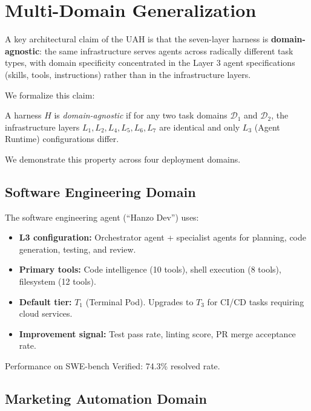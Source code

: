 \section{Multi-Domain Generalization}

\label{sec:domains}

A key architectural claim of the UAH is that the seven-layer harness is
\textbf{domain-agnostic}: the same infrastructure serves agents across
radically different task types, with domain specificity concentrated in the
Layer 3 agent specifications (skills, tools, instructions) rather than in
the infrastructure layers.

We formalize this claim:

\begin{definition}
A harness $H$ is \emph{domain-agnostic} if for any two task domains
$\mathcal{D}_1$ and $\mathcal{D}_2$, the infrastructure layers $L_1, L_2,
L_4, L_5, L_6, L_7$ are identical and only $L_3$ (Agent Runtime)
configurations differ.
\end{definition}

We demonstrate this property across four deployment domains.

\subsection{Software Engineering Domain}

The software engineering agent (``Hanzo Dev'') uses:
\begin{itemize}[leftmargin=1.5em]
    \item \textbf{L3 configuration:} Orchestrator agent + specialist agents
          for planning, code generation, testing, and review.
    \item \textbf{Primary tools:} Code intelligence (10 tools), shell
          execution (8 tools), filesystem (12 tools).
    \item \textbf{Default tier:} $T_1$ (Terminal Pod). Upgrades to $T_3$ for
          CI/CD tasks requiring cloud services.
    \item \textbf{Improvement signal:} Test pass rate, linting score, PR merge
          acceptance rate.
\end{itemize}

Performance on SWE-bench Verified: 74.3\% resolved rate.

\subsection{Marketing Automation Domain}

